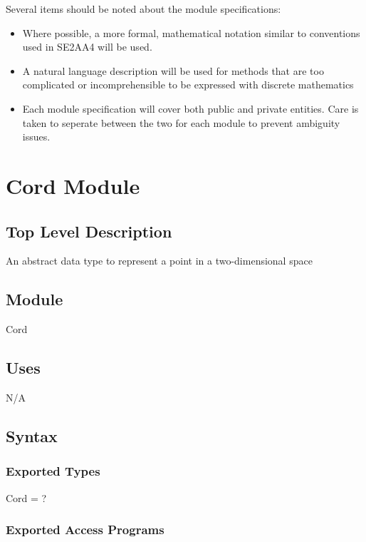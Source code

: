 \documentclass[12pt]{article}
\begin{document}
\noindent
Several items should be noted about the module specifications:
\begin{itemize}
\item Where possible, a more formal, mathematical notation similar to conventions 
used in SE2AA4 will be used.
\item A natural language description will be used for methods that are too
complicated or incomprehensible to be expressed with discrete mathematics
\item Each module specification will cover both public and private entities. Care
is taken to seperate between the two for each module to prevent ambiguity issues.
\end{itemize}

\newpage

\section*{Cord Module}

\subsection*{Top Level Description}

An abstract data type to represent a point in a two-dimensional space

\subsection*{Module}

Cord

\subsection* {Uses}

N/A

\subsection* {Syntax}

\subsubsection* {Exported Types}

Cord = ?

\subsubsection* {Exported Access Programs}
\end{document}
